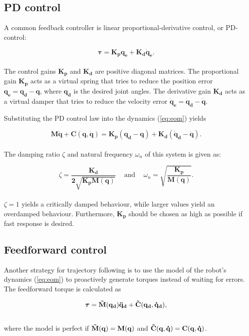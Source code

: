 \subsection{PD control}
A common feedback controller is linear proportional-derivative control, or PD-control:

\begin{equation}\label{eq:pd}
    \boldsymbol{\tau} = \mathbf{K_p q_e + K_d \dot{q}_e}.
\end{equation}
\\
The control gains $\mathbf{K_p}$ and $\mathbf{K_d}$ are positive diagonal matrices. The proportional gain $\mathbf{K_p}$ acts as a virtual spring that tries to reduce the position error $\mathbf{q_e = q_d - q}$, where $\mathbf{q_d}$ is the desired joint angles. The derivative gain $\mathbf{K_d}$ acts as a virtual damper that tries to reduce the velocity error $\mathbf{\dot{q}_e = \dot{q}_d - \dot{q}}$.

Substituting the PD control law into the dynamics (\ref{eq:eom}) yields

\begin{equation}\label{eq:control1}
    \mathbf{M \ddot{q} + C(q, \dot{q}) = K_p (q_d - q) + K_d (\dot{q}_d - \dot{q})}.
\end{equation}
\\
The damping ratio $\zeta$ and natural frequency $\omega_n$ of this system is given as:

\begin{equation}\label{eq:control2}
    \zeta = \mathbf{\frac{K_d}{2 \sqrt{K_p M(q)}}} \quad  \
    \textrm{and} \quad \
    \omega_n = \mathbf{\sqrt{\frac{K_p}{M(q)}}}.
\end{equation}
\\
$\zeta = 1$ yields a critically damped behaviour, while larger values yield an overdamped behaviour. Furthermore, $\mathbf{K_p}$ should be chosen as high as possible if fast response is desired.

\subsection{Feedforward control}
Another strategy for trajectory following is to use the model of the robot's dynamics (\ref{eq:eom}) to proactively generate torques instead of waiting for errors. The feedforward torque is calculated as 

\begin{equation}\label{eq:feedforward}
    \boldsymbol{\tau} = \mathbf{\Tilde{M}(q_d)\ddot{q}_d + \Tilde{C}(q_d, \dot{q}_d)},
\end{equation}
\\
where the model is perfect if $\mathbf{\Tilde{M}(q) = M(q)}$ and $\mathbf{\Tilde{C}(q,\dot{q}) = C(q,\dot{q})}$.



